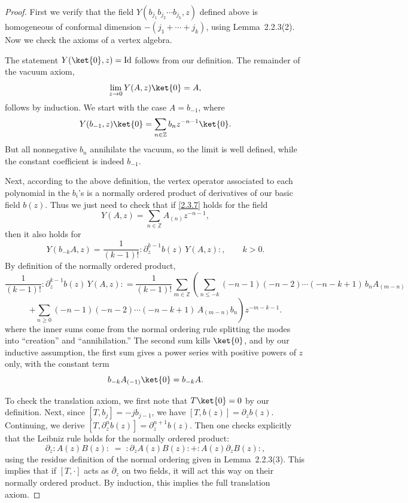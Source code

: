 \documentclass[12pt]{article}
\begin{document}
\begin{proof}
    First we verify that the field $Y(b_{j_1}b_{j_2}\cdots b_{j_k},z)$ defined above
    is homogeneous of conformal dimension $-(j_1+\cdots+j_k)$,
    using Lemma~2.2.3(2).
    Now we check the axioms of a vertex algebra.

    The statement $Y(\ket{0},z)=\mathrm{Id}$ follows from our definition.
    The remainder of the vacuum axiom,
    \begin{equation}\label{2.3.7}
        \lim_{z\to 0} Y(A,z)\ket{0} = A,
    \end{equation}
    follows by induction. We start with the case $A=b_{-1}$, where
    \[
        Y(b_{-1},z)\ket{0} = \sum_{n\in\mathbb{Z}} b_n z^{-n-1}\ket{0}.
    \]
    But all nonnegative $b_n$ annihilate the vacuum,
    so the limit is well defined, while the constant coefficient is indeed $b_{-1}$.

    Next, according to the above definition, the vertex operator associated to each
    polynomial in the $b_i$’s is a normally ordered product of derivatives
    of our basic field $b(z)$. Thus we just need to check that if \eqref{2.3.7}
    holds for the field
    \[
        Y(A,z)=\sum_{n\in\mathbb{Z}} A_{(n)}z^{-n-1},
    \]
    then it also holds for
    \[
        Y(b_{-k}A,z)
        = \frac{1}{(k-1)!}:\partial_z^{k-1}b(z)\,Y(A,z):,\qquad k>0.
    \]
    By definition of the normally ordered product,
    \[
        \frac{1}{(k-1)!}:\partial_z^{k-1}b(z)\,Y(A,z):
        = \frac{1}{(k-1)!}\sum_{m\in\mathbb{Z}}\!\!
        \left(
        \sum_{n\le -k} (-n-1)(-n-2)\cdots(-n-k+1)\,b_nA_{(m-n)}\right.
    \]
    \[
        \left.
        +\sum_{n\ge 0} (-n-1)(-n-2)\cdots(-n-k+1)\,A_{(m-n)}b_n
        \right)z^{-m-k-1}.
    \]
    where the inner sums come from the normal ordering rule splitting the modes into “creation” and “annihilation.”
    The second sum kills $\ket{0}$, and by our inductive assumption,
    the first sum gives a power series with positive powers of $z$ only,
    with the constant term
    \[
        b_{-k}A_{(-1)}\ket{0} = b_{-k}A.
    \]

    To check the translation axiom, we first note that $T\ket{0}=0$ by our definition.
    Next, since $[T,b_j] = -j b_{j-1}$, we have $[T,b(z)] = \partial_z b(z)$.
    Continuing, we derive $[T,\partial_z^n b(z)] = \partial_z^{n+1} b(z)$.
    Then one checks explicitly that the Leibniz rule holds for the normally ordered product:
    \[
        \partial_z :A(z)B(z): \;=\; :\partial_z A(z)B(z): + :A(z)\partial_z B(z):,
    \]
    using the residue definition of the normal ordering given in Lemma~2.2.3(3).
    This implies that if $[T,\cdot]$ acts as $\partial_z$ on two fields,
    it will act this way on their normally ordered product.
    By induction, this implies the full translation axiom.


\end{proof}
\end{document}
